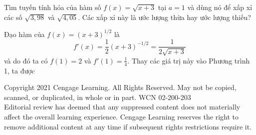 \begin{minipage}[t]{125mm}
  \hspace{0.8em}Tìm tuyến tính hóa của hàm số $f(x) = \sqrt{x + 3}$ tại $a = 1$ và dùng nó để xấp xỉ các số $\sqrt{3{,}98}$ và $\sqrt{4{,}05}$. Các xấp xỉ này là ước lượng thừa hay ước lượng thiếu?\par\vspace{6pt}
  
  \hspace{0.8em}Đạo hàm của $f(x) = (x + 3)^{1/2}$ là
  \[
  f'(x) = \frac{1}{2}(x + 3)^{-1/2} = \frac{1}{2\sqrt{x + 3}}
  \]
  và do đó ta có $f(1) = 2$ và $f'(1) = \frac{1}{4}$. Thay các giá trị này vào Phương trình 1, ta được
\end{minipage}

\vfill
\noindent
\begin{minipage}{\textwidth}
  \tiny\color{darkgraytext}
  Copyright 2021 Cengage Learning. All Rights Reserved. May not be copied, scanned, or duplicated, in whole or in part. WCN 02-200-203\\
  Editorial review has deemed that any suppressed content does not materially affect the overall learning experience. Cengage Learning reserves the right to remove additional content at any time if subsequent rights restrictions require it.
\end{minipage}
